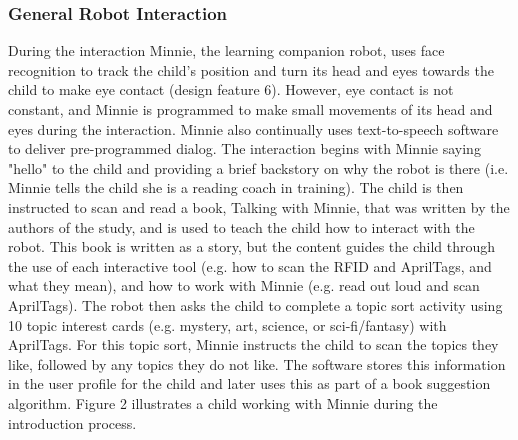 \documentclass{sigchi}
\begin{document}
\subsubsection{General Robot Interaction}

During the interaction Minnie, the learning companion robot, uses face recognition to track the child's position and turn its head and eyes towards the child to make eye contact (design feature 6). However, eye contact is not constant, and Minnie is programmed to make small movements of its head and eyes during the interaction. Minnie also continually uses text-to-speech software to deliver pre-programmed dialog. The interaction begins with Minnie saying "hello" to the child and providing a brief backstory on why the robot is there (i.e. Minnie tells the child she is a reading coach in training). The child is then instructed to scan and read a book, Talking with Minnie, that was written by the authors of the study, and is used to teach the child how to interact with the robot. This book is written as a story, but the content guides the child through the use of each interactive tool (e.g. how to scan the RFID and AprilTags, and what they mean), and how to work with Minnie (e.g. read out loud and scan AprilTags). The robot then asks the child to complete a topic sort activity using 10 topic interest cards (e.g. mystery, art, science, or sci-fi/fantasy) with AprilTags. For this topic sort, Minnie instructs the child to scan the topics they like, followed by any topics they do not like. The software stores this information in the user profile for the child and later uses this as part of a book suggestion algorithm. Figure 2 illustrates a child working with Minnie during the introduction process.
\end{document}
